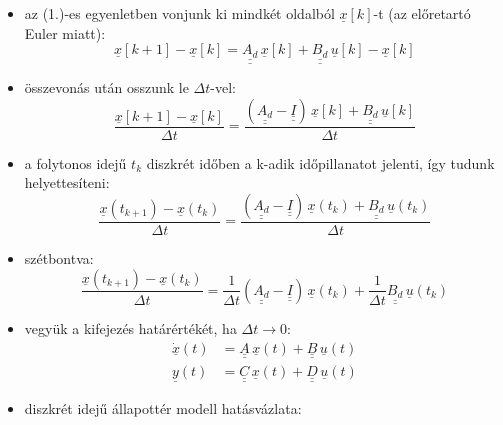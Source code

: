 \begin{itemize}
    \item az (1.)-es egyenletben vonjunk ki mindkét oldalból $\underline{x}[k]$-t (az előretartó Euler miatt):
    $$ \underline{x}[k+1] - \underline{x}[k] = \underline{\underline{A_d}} \, \underline{x}[k] + \underline{\underline{B_d}} \, \underline{u}[k] - \underline{x}[k] $$
    
    \item összevonás után osszunk le $\Delta t$-vel:
    $$ \frac{\underline{x}[k+1] - \underline{x}[k]}{\Delta t} = \frac{(\underline{\underline{A_d}} - \underline{\underline{I}}) \, \underline{x}[k] + \underline{\underline{B_d}} \, \underline{u}[k]}{\Delta t} $$
    
    \item a folytonos idejű $t_k$ diszkrét időben a k-adik időpillanatot jelenti, így tudunk helyettesíteni:
    $$ \frac{\underline{x}(t_{k+1}) - \underline{x}(t_k)}{\Delta t} = \frac{(\underline{\underline{A_d}} - \underline{\underline{I}}) \, \underline{x}(t_k) + \underline{\underline{B_d}} \, \underline{u}(t_k)}{\Delta t} $$
    
    \item szétbontva:
    $$ \frac{\underline{x}(t_{k+1}) - \underline{x}(t_k)}{\Delta t} = \frac{1}{\Delta t} (\underline{\underline{A_d}} - \underline{\underline{I}}) \, \underline{x}(t_k) + \frac{1}{\Delta t} \underline{\underline{B_d}} \, \underline{u}(t_k) $$
    
    \item vegyük a kifejezés határértékét, ha $\Delta t \to 0$:
    \begin{align*}
        \underline{\dot{x}}(t) &= \underline{\underline{A}} \, \underline{x}(t) + \underline{\underline{B}} \, \underline{u}(t) \\
        \underline{y}(t) &= \underline{\underline{C}} \, \underline{x}(t) + \underline{\underline{D}} \, \underline{u}(t)
    \end{align*}

    \item diszkrét idejű állapottér modell hatásvázlata:
    \begin{figure}[H]
        \centering
\end{figure}
\end{itemize}
